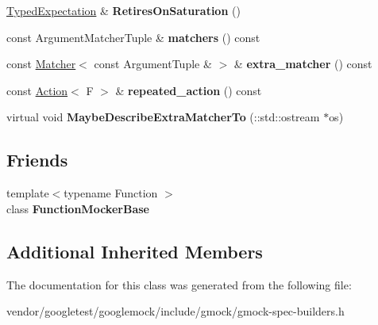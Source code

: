 \begin{DoxyCompactItemize}
\item 
\hyperlink{classtesting_1_1internal_1_1TypedExpectation}{Typed\+Expectation} \& {\bfseries Retires\+On\+Saturation} ()\hypertarget{classtesting_1_1internal_1_1TypedExpectation_ae7c42958a5d2c336ba7a42a871bf7709}{}\label{classtesting_1_1internal_1_1TypedExpectation_ae7c42958a5d2c336ba7a42a871bf7709}

\item 
const Argument\+Matcher\+Tuple \& {\bfseries matchers} () const \hypertarget{classtesting_1_1internal_1_1TypedExpectation_ac5c36609fee376f13bd9cfb2a9b41c9e}{}\label{classtesting_1_1internal_1_1TypedExpectation_ac5c36609fee376f13bd9cfb2a9b41c9e}

\item 
const \hyperlink{classtesting_1_1Matcher}{Matcher}$<$ const Argument\+Tuple \& $>$ \& {\bfseries extra\+\_\+matcher} () const \hypertarget{classtesting_1_1internal_1_1TypedExpectation_a6a46d9c67fd38c367ce0a0d63e65e523}{}\label{classtesting_1_1internal_1_1TypedExpectation_a6a46d9c67fd38c367ce0a0d63e65e523}

\item 
const \hyperlink{classtesting_1_1Action}{Action}$<$ F $>$ \& {\bfseries repeated\+\_\+action} () const \hypertarget{classtesting_1_1internal_1_1TypedExpectation_a3af1ffccd9d897297fb19762b1551dec}{}\label{classtesting_1_1internal_1_1TypedExpectation_a3af1ffccd9d897297fb19762b1551dec}

\item 
virtual void {\bfseries Maybe\+Describe\+Extra\+Matcher\+To} (\+::std\+::ostream $\ast$os)\hypertarget{classtesting_1_1internal_1_1TypedExpectation_ab019251041a408dc5a5d8ae216be53f4}{}\label{classtesting_1_1internal_1_1TypedExpectation_ab019251041a408dc5a5d8ae216be53f4}

\end{DoxyCompactItemize}
\subsection*{Friends}
\begin{DoxyCompactItemize}
\item 
{\footnotesize template$<$typename Function $>$ }\\class {\bfseries Function\+Mocker\+Base}\hypertarget{classtesting_1_1internal_1_1TypedExpectation_a1771ea4a3d92d8b2ff0f0aa6fc40ff55}{}\label{classtesting_1_1internal_1_1TypedExpectation_a1771ea4a3d92d8b2ff0f0aa6fc40ff55}

\end{DoxyCompactItemize}
\subsection*{Additional Inherited Members}


The documentation for this class was generated from the following file\+:\begin{DoxyCompactItemize}
\item 
vendor/googletest/googlemock/include/gmock/gmock-\/spec-\/builders.\+h\end{DoxyCompactItemize}
